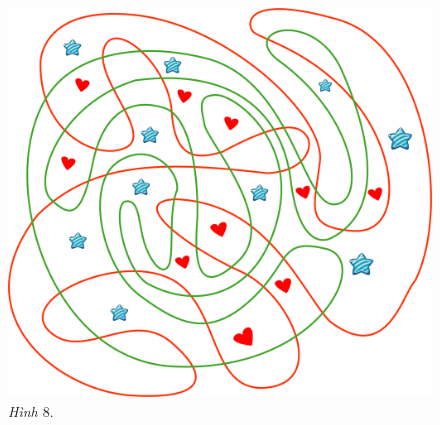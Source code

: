 \begin{multicols}{2}
\begin{figure}[H]
		\includegraphics[width=1\linewidth]{8}
		\caption{\small\textit{Hình $8.$}}
	\end{figure}
\end{multicols}
